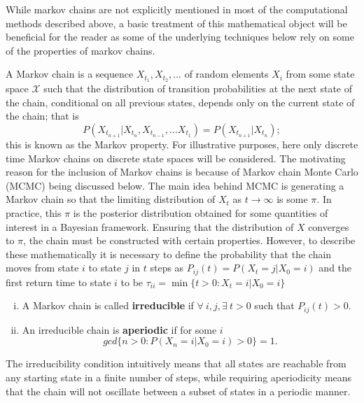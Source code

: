 While markov chains are not explicitly mentioned in most of the computational methods described above, a basic treatment of this mathematical object will be beneficial for the reader as some of the underlying techniques below rely on some of the properties of markov chains.

A Markov chain is a sequence $X_{t_1}, X_{t_2}, ...$ of random elements $X_i$ from some state space $\mathscr{X}$ such that the distribution of transition probabilities at the next state of the chain, conditional on all previous states, depends only on the current state of the chain; that is 
    \begin{equation}
        P(X_{t_{n+1}}|X_{t_n},X_{t_{n-1}},\ldots X_{t_1}) = P(X_{t_{n+1}}|X_{t_n});
    \end{equation}
this is known as the Markov property.
For illustrative purposes, here only discrete time Markov chains on discrete state spaces will be considered. The motivating reason for the inclusion of Markov chains is because of Markov chain Monte Carlo (MCMC) being discussed below.
The main idea behind MCMC is generating a Markov chain so that the limiting distribution of $X_t$ as $t\rightarrow\infty$ is some $\pi$. 
In practice, this $\pi$ is the posterior distribution obtained for some quantities of interest in a Bayesian framework. 
Ensuring that the distribution of $X$ converges to $\pi$, the chain must be constructed with certain properties. However, to describe these mathematically it is necessary to define the probability that the chain moves from state $i$ to state $j$ in $t$ steps as $ P_{ij}(t) = P(X_t = j | X_0 = i)$
and the first return time to state $i$ to be $\tau_{ii} = \min\{t>0:X_t = i|X_0 = i\}$
    \begin{enumerate}[(i)]
        \item A Markov chain is called \textbf{irreducible} if $\forall~i,j, \exists~t > 0$ such that $P_{ij}(t) > 0$.
        \item An irreducible chain is \textbf{aperiodic} if for some $i$
            $$gcd\{n>0:P(X_n = i|X_0 = i) > 0\} =1. $$
    \end{enumerate}
The irreducibility condition intuitively means that all states are reachable from any starting state in a finite number of steps, while requiring aperiodicity means that the chain will not oscillate between a subset of states in a periodic manner. 